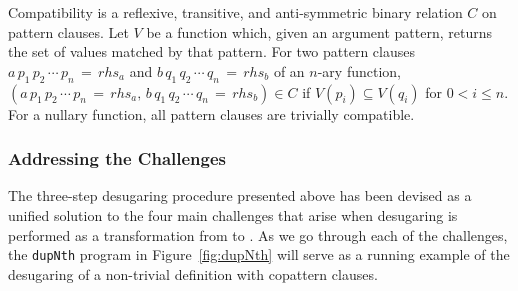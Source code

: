 

\begin{definition}
\label{def:compatibility}
Compatibility is a reflexive, transitive, and anti-symmetric binary relation $C$
on pattern clauses. Let $V$ be a function which, given an argument pattern,
returns the set of values matched by that pattern. For two pattern clauses
$a\,p_{1}\,p_{2}\,\cdots\,p_{n}\,=\,rhs_{a}$ and
$b\,q_{1}\,q_{2}\,\cdots\,q_{n}\,=\,rhs_{b}$ of an $n$-ary function,
$(a\,p_{1}\,p_{2}\,\cdots\,p_{n}\,=\,rhs_{a},\,b\,q_{1}\,q_{2}\,\cdots\,q_{n}\,=\,rhs_{b})\in C$ if $V(p_{i})\subseteq V(q_{i})$ for $0 < i\le n$. For a nullary
function, all pattern clauses are trivially compatible.
\end{definition}

\subsubsection{Addressing the Challenges}
The three-step desugaring procedure presented above has been devised as a
unified solution to the four main challenges that arise when desugaring is performed
as a transformation from \IdrisM{} to \IdrisM{}. As we go through each of the
challenges, the \texttt{dupNth} program in Figure~\ref{fig:dupNth} will serve as
a running example of the desugaring of a non-trivial definition with copattern
clauses.

